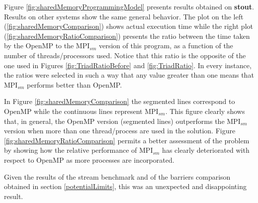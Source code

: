 Figure \ref{fig:sharedMemoryProgrammingModel} presents results obtained on \textbf{stout}. Results on other systems show the same general behavior. The plot on the left (\ref{fig:sharedMemoryComparison}) shows actual execution time while the right plot (\ref{fig:sharedMemoryRatioComparison}) presents the ratio between the time taken by the OpenMP to the MPI$_{sm}$ version of this program, as a function of the number of threads/processors used. Notice that this ratio is the opposite of the one used in Figures \ref{fig:TriadRatioBefore} and \ref{fig:TriadRatio}. In every instance, the ratios were selected in such a way that any value greater than one means that MPI$_{sm}$ performs better than OpenMP.

\medskip

In Figure \ref{fig:sharedMemoryComparison} the segmented lines correspond to OpenMP while the continuous lines represent MPI$_{sm}$. This figure clearly shows that, in general, the OpenMP version (segmented lines) outperforms the MPI$_{sm}$ version when more than one thread/process are used in the solution. Figure \ref{fig:sharedMemoryRatioComparison} permits a better assessment of the problem by showing how the relative performance of MPI$_{sm}$ has clearly deteriorated with respect to OpenMP as more processes are incorporated.


\medskip

Given the results of the stream benchmark and of the barriers comparison obtained in section \ref{potentialLimits}, this was an unexpected and disappointing result.

